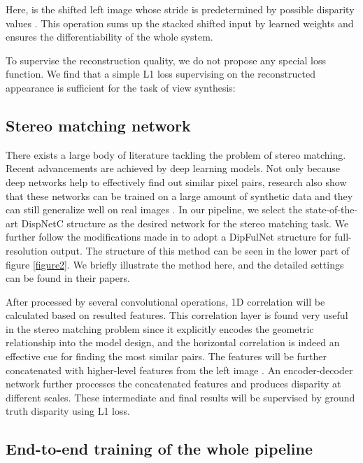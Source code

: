 \documentclass[10pt,twocolumn,letterpaper]{article}
\begin{document}
\vspace{-11pt}

\vspace{-9pt}

Here,  is the shifted left image whose stride is predetermined by possible disparity values . This operation sums up the stacked shifted input by learned weights and ensures the differentiability of the whole system.

To supervise the reconstruction quality, we do not propose any special loss function. We find that a simple L1 loss supervising on the reconstructed appearance is sufficient for the task of view synthesis:

\vspace{-8pt}


\subsection{Stereo matching network}
There exists a large body of literature tackling the problem of stereo matching. Recent advancements are achieved by deep learning models. Not only because deep networks help to effectively find out similar pixel pairs, research also show that these networks can be trained on a large amount of synthetic data and they can still generalize well on real images \cite{mayer2016disp}. In our pipeline, we select the state-of-the-art DispNetC \cite{mayer2016disp} structure as the desired network for the stereo matching task. We further follow the modifications made in \cite{pang2017cascade} to adopt a DipFulNet structure for full-resolution output. The structure of this method can be seen in the lower part of figure \ref{figure2}. We briefly illustrate the method here, and the detailed settings can be found in their papers.

After processed by several convolutional operations, 1D correlation will be calculated based on resulted features. This correlation layer is found very useful in the stereo matching problem since it explicitly encodes the geometric relationship into the model design, and the horizontal correlation is indeed an effective cue for finding the most similar pairs. The features will be further concatenated with higher-level features from the left image . An encoder-decoder network further processes the concatenated features and produces disparity at different scales. These intermediate and final results will be supervised by ground truth disparity using L1 loss. 

\subsection{End-to-end training of the whole pipeline}
\end{document}
